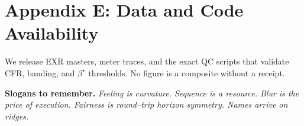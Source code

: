 \documentclass[11pt]{article}
\newcommand{\1}{\mathbf{1}}
\begin{document}
\section{Appendix E: Data and Code Availability}
\label{app:data}

We release EXR masters, meter traces, and the exact QC scripts that validate CFR, banding, and $\beta^\star$ thresholds. No figure is a composite without a receipt.

\vspace{1em}
\noindent\textbf{Slogans to remember.} \emph{Feeling is curvature. Sequence is a resource. Blur is the price of execution. Fairness is round--trip horizon symmetry. Names arrive on ridges.}

\end{document}
